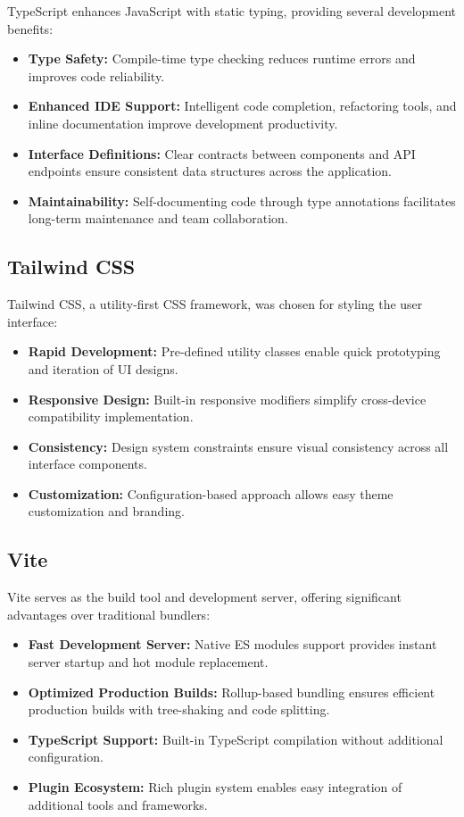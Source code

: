TypeScript enhances JavaScript with static typing, providing several development benefits:

\begin{itemize}
    \item \textbf{Type Safety:} Compile-time type checking reduces runtime errors and improves code reliability.
    \item \textbf{Enhanced IDE Support:} Intelligent code completion, refactoring tools, and inline documentation improve development productivity.
    \item \textbf{Interface Definitions:} Clear contracts between components and API endpoints ensure consistent data structures across the application.
    \item \textbf{Maintainability:} Self-documenting code through type annotations facilitates long-term maintenance and team collaboration.
\end{itemize}

\subsection{Tailwind CSS}

Tailwind CSS, a utility-first CSS framework, was chosen for styling the user interface:

\begin{itemize}
    \item \textbf{Rapid Development:} Pre-defined utility classes enable quick prototyping and iteration of UI designs.
    \item \textbf{Responsive Design:} Built-in responsive modifiers simplify cross-device compatibility implementation.
    \item \textbf{Consistency:} Design system constraints ensure visual consistency across all interface components.
    \item \textbf{Customization:} Configuration-based approach allows easy theme customization and branding.
\end{itemize}

\subsection{Vite}

Vite serves as the build tool and development server, offering significant advantages over traditional bundlers:

\begin{itemize}
    \item \textbf{Fast Development Server:} Native ES modules support provides instant server startup and hot module replacement.
    \item \textbf{Optimized Production Builds:} Rollup-based bundling ensures efficient production builds with tree-shaking and code splitting.
    \item \textbf{TypeScript Support:} Built-in TypeScript compilation without additional configuration.
    \item \textbf{Plugin Ecosystem:} Rich plugin system enables easy integration of additional tools and frameworks.
\end{itemize}

